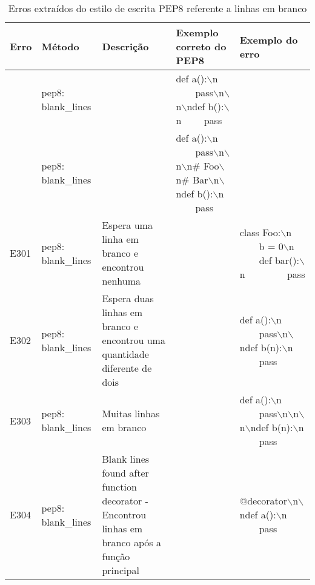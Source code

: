 	\begin{landscape}
		\begin{table}
			\scriptsize
			\begin{tabularx}{\linewidth}{ |p{1cm}|p{3cm}|X|X|X|}
				\hline
				\textbf{Erro}
				& \textbf{Método}
				& \textbf{Descrição}
				& \textbf{Exemplo correto do PEP8}
				& \textbf{Exemplo do erro} \\
				\hline
				
				& pep8: blank\_lines 
				&   
				& def a():$\backslash$n \ \ \ \ pass$\backslash$n$\backslash$n$\backslash$ndef b():$\backslash$n \ \ \ \ pass 
				&  \\ 
				\hline
				
				& pep8: blank\_lines 
				&   
				& def a():$\backslash$n \ \ \ \ pass$\backslash$n$\backslash$n$\backslash$n\# Foo$\backslash$n\# Bar$\backslash$n$\backslash$ndef b():$\backslash$n \ \ \ \ pass 
				&  \\ 
				\hline
				E301 
				& pep8: blank\_lines 
				& Espera uma linha em branco e encontrou nenhuma 
				&   
				& class Foo:$\backslash$n \ \ \ \ b = 0$\backslash$n \ \ \ \ def bar():$\backslash$n \ \ \ \  \ \ \ \ pass \\ 
				\hline
				E302 
				& pep8: blank\_lines 
				& Espera duas linhas em branco e encontrou uma quantidade diferente de dois 
				&   
				& def a():$\backslash$n \ \ \ \ pass$\backslash$n$\backslash$ndef b(n):$\backslash$n \ \ \ \ pass \\ 
				\hline
				E303 
				& pep8: blank\_lines 
				& Muitas linhas em branco 
				&   
				& def a():$\backslash$n \ \ \ \ pass$\backslash$n$\backslash$n$\backslash$n$\backslash$ndef b(n):$\backslash$n \ \ \ \ pass \\ 
				\hline
				E304 
				& pep8: blank\_lines 
				& Blank lines found after function decorator - Encontrou linhas em branco após a função principal 
				&   
				& @decorator$\backslash$n$\backslash$ndef a():$\backslash$n \ \ \ \ pass \\ 
				\hline
			\end{tabularx}
			\captionsetup{justification=centering}
			\caption{Erros extraídos do estilo de escrita PEP8 referente a linhas em branco}
			\label{tab:pep8E300}
		\end{table}
	\end{landscape}
	
